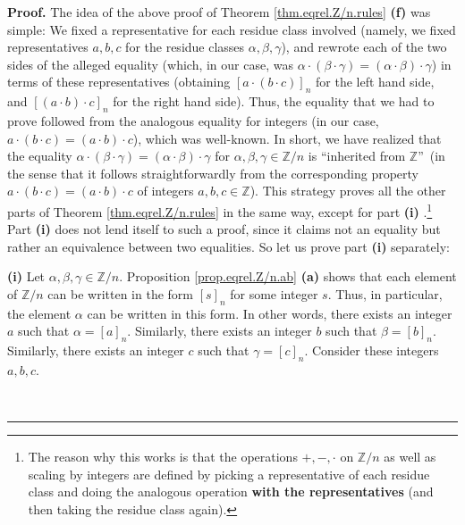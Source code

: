 \documentclass[numbers=enddot,12pt,final,onecolumn,notitlepage]{scrartcl}%
\numberwithin{exer}{subsection}
\theoremstyle{definition}
\newenvironment{proof}[1][Proof]{\noindent\textbf{#1.} }{\ \rule{0.5em}{0.5em}}
\begin{document}
\begin{proof}
The idea of the above proof of Theorem \ref{thm.eqrel.Z/n.rules} \textbf{(f)}
was simple: We fixed a representative for each residue class involved (namely,
we fixed representatives $a,b,c$ for the residue classes $\alpha,\beta,\gamma
$), and rewrote each of the two sides of the alleged equality (which, in our
case, was $\alpha\cdot\left(  \beta\cdot\gamma\right)  =\left(  \alpha
\cdot\beta\right)  \cdot\gamma$) in terms of these representatives (obtaining
$\left[  a\cdot\left(  b\cdot c\right)  \right]  _{n}$ for the left hand side,
and $\left[  \left(  a\cdot b\right)  \cdot c\right]  _{n}$ for the right hand
side). Thus, the equality that we had to prove followed from the analogous
equality for integers (in our case, $a\cdot\left(  b\cdot c\right)  =\left(
a\cdot b\right)  \cdot c$), which was well-known. In short, we have realized
that the equality $\alpha\cdot\left(  \beta\cdot\gamma\right)  =\left(
\alpha\cdot\beta\right)  \cdot\gamma$ for $\alpha,\beta,\gamma\in\mathbb{Z}/n$
is \textquotedblleft inherited from $\mathbb{Z}$\textquotedblright\ (in the
sense that it follows straightforwardly from the corresponding property
$a\cdot\left(  b\cdot c\right)  =\left(  a\cdot b\right)  \cdot c$ of integers
$a,b,c\in\mathbb{Z}$). This strategy proves all the other parts of Theorem
\ref{thm.eqrel.Z/n.rules} in the same way, except for part \textbf{(i)}%
.\footnote{The reason why this works is that the operations $+,-,\cdot$ on
$\mathbb{Z}/n$ as well as scaling by integers are defined by picking a
representative of each residue class and doing the analogous operation
\textbf{with the representatives} (and then taking the residue class again).}
Part \textbf{(i)} does not lend itself to such a proof, since it claims not an
equality but rather an equivalence between two equalities. So let us prove
part \textbf{(i)} separately:

\textbf{(i)} Let $\alpha,\beta,\gamma\in\mathbb{Z}/n$. Proposition
\ref{prop.eqrel.Z/n.ab} \textbf{(a)} shows that each element of $\mathbb{Z}/n$
can be written in the form $\left[  s\right]  _{n}$ for some integer $s$.
Thus, in particular, the element $\alpha$ can be written in this form. In
other words, there exists an integer $a$ such that $\alpha=\left[  a\right]
_{n}$. Similarly, there exists an integer $b$ such that $\beta=\left[
b\right]  _{n}$. Similarly, there exists an integer $c$ such that
$\gamma=\left[  c\right]  _{n}$. Consider these integers $a,b,c$.


\end{proof}
\end{document}
